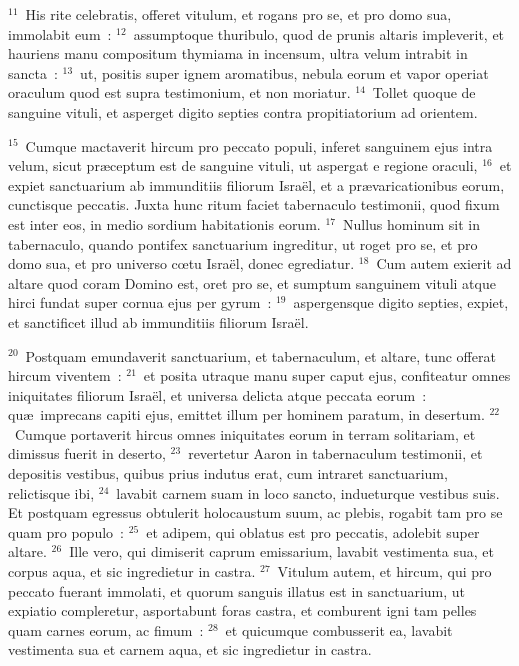 ${}^{11}$~His rite celebratis, offeret vitulum, et rogans pro se, et pro domo sua, immolabit eum~:
${}^{12}$~assumptoque thuribulo, quod de prunis altaris impleverit, et hauriens manu compositum thymiama in incensum, ultra velum intrabit in sancta~:
${}^{13}$~ut, positis super ignem aromatibus, nebula eorum et vapor operiat oraculum quod est supra testimonium, et non moriatur.
${}^{14}$~Tollet quoque de sanguine vituli, et asperget digito septies contra propitiatorium ad orientem.


${}^{15}$~Cumque mactaverit hircum pro peccato populi, inferet sanguinem ejus intra velum, sicut pr\ae ceptum est de sanguine vituli, ut aspergat e regione oraculi,
${}^{16}$~et expiet sanctuarium ab immunditiis filiorum Isra\"el, et a pr\ae varicationibus eorum, cunctisque peccatis. Juxta hunc ritum faciet tabernaculo testimonii, quod fixum est inter eos, in medio sordium habitationis eorum.
${}^{17}$~Nullus hominum sit in tabernaculo, quando pontifex sanctuarium ingreditur, ut roget pro se, et pro domo sua, et pro universo cœtu Isra\"el, donec egrediatur.
${}^{18}$~Cum autem exierit ad altare quod coram Domino est, oret pro se, et sumptum sanguinem vituli atque hirci fundat super cornua ejus per gyrum~:
${}^{19}$~aspergensque digito septies, expiet, et sanctificet illud ab immunditiis filiorum Isra\"el.


${}^{20}$~Postquam emundaverit sanctuarium, et tabernaculum, et altare, tunc offerat hircum viventem~:
${}^{21}$~et posita utraque manu super caput ejus, confiteatur omnes iniquitates filiorum Isra\"el, et universa delicta atque peccata eorum~: qu\ae\ imprecans capiti ejus, emittet illum per hominem paratum, in desertum.
${}^{22}$~Cumque portaverit hircus omnes iniquitates eorum in terram solitariam, et dimissus fuerit in deserto,
${}^{23}$~revertetur Aaron in tabernaculum testimonii, et depositis vestibus, quibus prius indutus erat, cum intraret sanctuarium, relictisque ibi,
${}^{24}$~lavabit carnem suam in loco sancto, indueturque vestibus suis. Et postquam egressus obtulerit holocaustum suum, ac plebis, rogabit tam pro se quam pro populo~:
${}^{25}$~et adipem, qui oblatus est pro peccatis, adolebit super altare.
${}^{26}$~Ille vero, qui dimiserit caprum emissarium, lavabit vestimenta sua, et corpus aqua, et sic ingredietur in castra.
${}^{27}$~Vitulum autem, et hircum, qui pro peccato fuerant immolati, et quorum sanguis illatus est in sanctuarium, ut expiatio compleretur, asportabunt foras castra, et comburent igni tam pelles quam carnes eorum, ac fimum~:
${}^{28}$~et quicumque combusserit ea, lavabit vestimenta sua et carnem aqua, et sic ingredietur in castra.


